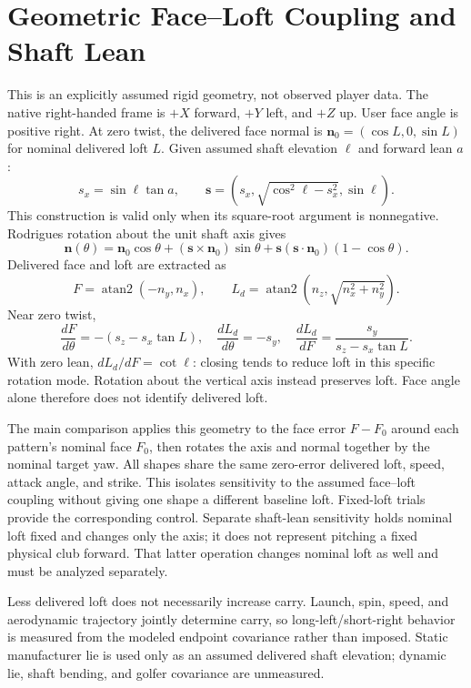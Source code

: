 \documentclass[11pt,letterpaper]{article}
\begin{document}
\section{Geometric Face--Loft Coupling and Shaft Lean}
This is an explicitly assumed rigid geometry, not observed player data.
The native right-handed frame is $+X$ forward, $+Y$ left, and $+Z$ up.
User face angle is positive right. At zero twist, the delivered face normal is
$\mathbf n_0=(\cos L,0,\sin L)$ for nominal delivered loft $L$.
Given assumed shaft elevation $\ell$ and forward lean $a$:
\[
 s_x=\sin\ell\tan a,\qquad
 \mathbf s=(s_x,\sqrt{\cos^2\ell-s_x^2},\sin\ell).
\]
This construction is valid only when its square-root argument is nonnegative.
Rodrigues rotation about the unit shaft axis gives
\[
 \mathbf n(\theta)=\mathbf n_0\cos\theta+
 (\mathbf s\times\mathbf n_0)\sin\theta+
 \mathbf s(\mathbf s\cdot\mathbf n_0)(1-\cos\theta).
\]
Delivered face and loft are extracted as
\[
 F=\operatorname{atan2}(-n_y,n_x),\qquad
 L_d=\operatorname{atan2}(n_z,\sqrt{n_x^2+n_y^2}).
\]
Near zero twist,
\[
 \frac{dF}{d\theta}=-(s_z-s_x\tan L),\quad
 \frac{dL_d}{d\theta}=-s_y,\quad
 \frac{dL_d}{dF}=\frac{s_y}{s_z-s_x\tan L}.
\]
With zero lean, $dL_d/dF=\cot\ell$: closing tends to reduce loft in this
specific rotation mode. Rotation about the vertical axis instead preserves
loft. Face angle alone therefore does not identify delivered loft.

The main comparison applies this geometry to the face error $F-F_0$ around
each pattern's nominal face $F_0$, then rotates the axis and normal together
by the nominal target yaw. All shapes share the same zero-error delivered
loft, speed, attack angle, and strike. This isolates sensitivity to the assumed
face--loft coupling without giving one shape a different baseline loft.
Fixed-loft trials provide the corresponding control. Separate shaft-lean
sensitivity holds nominal loft fixed and changes only the axis; it does not
represent pitching a fixed physical club forward. That latter operation
changes nominal loft as well and must be analyzed separately.

Less delivered loft does not necessarily increase carry. Launch, spin, speed,
and aerodynamic trajectory jointly determine carry, so long-left/short-right
behavior is measured from the modeled endpoint covariance rather than imposed.
Static manufacturer lie is used only as an assumed delivered shaft elevation;
dynamic lie, shaft bending, and golfer covariance are unmeasured.
\end{document}
